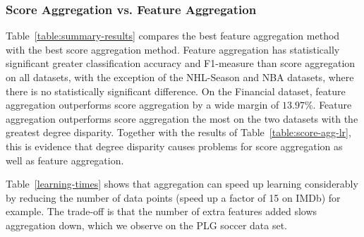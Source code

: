 \documentclass[conference]{IEEEtran}
\begin{document}
\begin{table}[ht]
\caption{Learning Time in Seconds}
\centering
{}
\label{learning-times}
\end{table}

\subsubsection{Score Aggregation vs. Feature Aggregation} Table~\ref{table:summary-results} compares the best feature aggregation method with the best score aggregation method. Feature aggregation has statistically significant greater classification accuracy and F1-measure than score aggregation on all datasets, with the exception of the NHL-Season and NBA datasets, where there is no statistically significant difference. On the Financial dataset, feature aggregation outperforms score aggregation by a wide margin of $13.97\%$.
Feature aggregation outperforms score aggregation the most on the two datasets with the greatest degree disparity. Together with the results of Table~\ref{table:score-agg-lr}, this is evidence that degree disparity causes problems for score aggregation as well as feature aggregation.

Table~\ref{learning-times} shows that aggregation can speed up learning considerably by reducing the number of data points (speed up a factor of 15 on IMDb) for example. The trade-off is that the number of extra features added slows aggregation down, which we observe on the PLG soccer data set.
%

\end{document}
